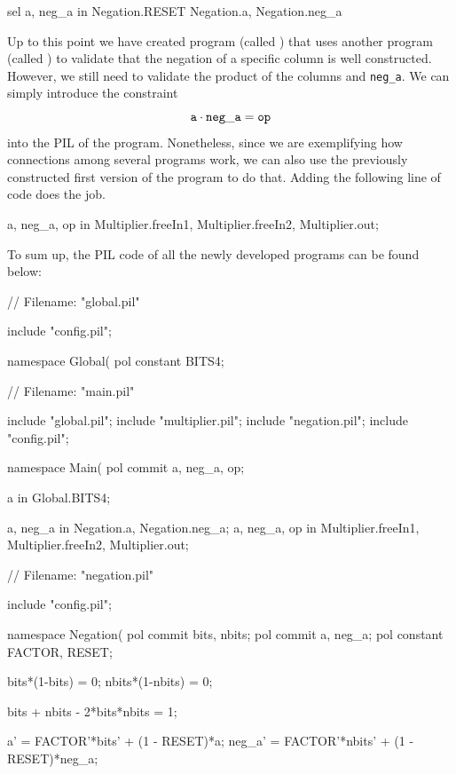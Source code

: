 \begin{pil}
    sel {a, neg_a} in Negation.RESET {Negation.a, Negation.neg_a}
\end{pil}


Up to this point we have created program (called \Main) that uses another program (called \Negation) to validate that the negation of a specific column \att is well constructed. However, we still need to validate the product of the columns \att and \texttt{neg\_a}. We can simply introduce the constraint 
\[
\mathtt{a} \cdot \mathtt{neg\_a} = \mathtt{op}
\]
into the PIL of the \Main program. Nonetheless, since we are exemplifying how connections among several programs work, we can also use the previously constructed first version of the \Multiplier program to do that. Adding the following line of code does the job.

\begin{pil}
    {a, neg_a, op} in {Multiplier.freeIn1, Multiplier.freeIn2, Multiplier.out};
\end{pil}

To sum up, the PIL code of all the newly developed programs can be found below:

\begin{pil}
    // Filename: "global.pil"
    
    include "config.pil";
    
    namespace Global(%
    pol constant BITS4;
\end{pil}

\begin{pil}
    // Filename: "main.pil"
    
    include "global.pil";
    include "multiplier.pil";
    include "negation.pil";
    include "config.pil";
    
    namespace Main(%
    pol commit a, neg_a, op;
    
    a in Global.BITS4;
    
    {a, neg_a} in {Negation.a, Negation.neg_a};
    {a, neg_a, op} in {Multiplier.freeIn1, Multiplier.freeIn2, Multiplier.out};
\end{pil}

\begin{pil}
    // Filename: "negation.pil"
    
    include "config.pil";
    
    namespace Negation(%
    pol commit bits, nbits;
    pol commit a, neg_a;
    pol constant FACTOR, RESET;
    
    bits*(1-bits) = 0;
    nbits*(1-nbits) = 0;
    
    bits + nbits - 2*bits*nbits = 1;
    
    a' = FACTOR'*bits' + (1 - RESET)*a;
    neg_a' = FACTOR'*nbits' + (1 - RESET)*neg_a;
\end{pil}

